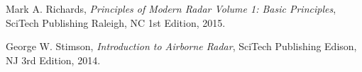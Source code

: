 \documentclass[12pt]{article}
\begin{document}
      \begin{thebibliography}{9}

        Mark A. Richards,
        \emph{Principles of Modern Radar Volume 1: Basic Principles},
        SciTech Publishing Raleigh, NC
        1st Edition,
        2015.

        George W. Stimson,
        \emph{Introduction to Airborne Radar},
        SciTech Publishing Edison, NJ
        3rd Edition,
        2014.

      \end{thebibliography}

       
       
\end{document}

